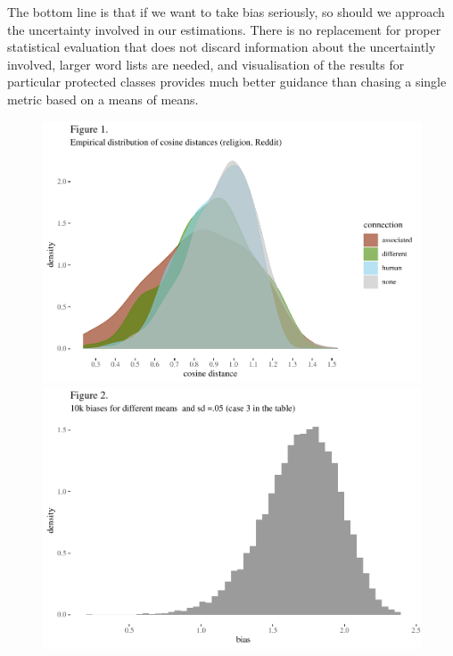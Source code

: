 \documentclass[
  12pt,
  dvipsnames,enabledeprecatedfontcommands]{scrartcl}
\begin{document}
The bottom line is that if we want to take bias seriously, so should we
approach the uncertainty involved in our estimations. There is no
replacement for proper statistical evaluation that does not discard
information about the uncertaintly involved, larger word lists are
needed, and visualisation of the results for particular protected
classes provides much better guidance than chasing a single metric based
on a means of means.

\pagebreak

\begin{center}
\begin{figure}[!htb]\centering
   \begin{minipage}{0.48\textwidth}

\begin{center}\includegraphics[width=1\linewidth]{abstractESSLLI1_files/figure-latex/unnamed-chunk-1-1} \end{center}
   \end{minipage}
   \begin {minipage}{0.48\textwidth}

\begin{center}\includegraphics[width=1\linewidth]{abstractESSLLI1_files/figure-latex/unnamed-chunk-2-1} \end{center}
   \end{minipage}
   

\end{figure}
\end{center}
\end{document}
